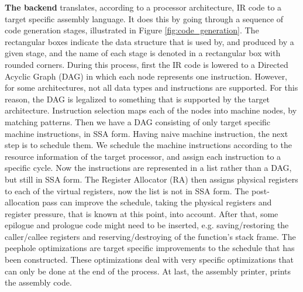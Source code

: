 \textbf{The backend} translates, according to a processor architecture, IR code to a target specific assembly language. It does this by going through a sequence of code generation stages, illustrated in Figure \ref{fig:code_generation}. The rectangular boxes indicate the data structure that is used by, and produced by a given stage, and the name of each stage is denoted in a rectangular box with rounded corners. During this process, first the IR code is lowered to a Directed Acyclic Graph (DAG) in which each node represents one instruction. However, for some architectures, not all data types and instructions are supported. For this reason, the DAG is legalized to something that is supported by the target architecture. Instruction selection maps each of the nodes into machine nodes, by matching patterns. %
Then we have a DAG consisting of only target specific machine instructions, in SSA form. Having naive machine instruction, the next step is to schedule them. We schedule the machine instructions according to the resource information of the target processor, and assign each instruction to a specific cycle. 
Now the instructions are represented in a list rather than a DAG, but still in SSA form. The Register Allocator (RA) then assigns physical registers to each of the virtual registers, now the list is not in SSA form. 
The post-allocation pass can improve the schedule, taking the physical registers and register pressure, that is known at this point, into account. After that, some epilogue and prologue code might need to be inserted, e.g. saving/restoring the caller/callee registers and reserving/destroying of the function's stack frame. The peephole optimizations are target specific improvements to the schedule that has been constructed. These optimizations deal with very specific optimizations that can only be done at the end of the process. At last, the assembly printer, prints the assembly code.






